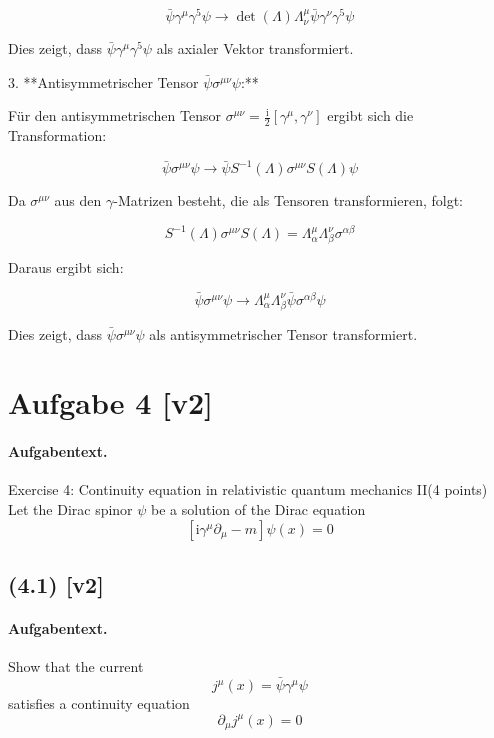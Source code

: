 \documentclass[11pt,a4paper]{article}
\begin{document}
\[
\bar{\psi} \gamma^\mu \gamma^5 \psi \rightarrow \operatorname{det}(\Lambda) \Lambda_\nu^\mu \bar{\psi} \gamma^\nu \gamma^5 \psi
\]

Dies zeigt, dass \(\bar{\psi} \gamma^\mu \gamma^5 \psi\) als axialer Vektor transformiert.

3. **Antisymmetrischer Tensor \(\bar{\psi} \sigma^{\mu \nu} \psi\):**

Für den antisymmetrischen Tensor \(\sigma^{\mu \nu} = \frac{\mathrm{i}}{2} [\gamma^\mu, \gamma^\nu]\) ergibt sich die Transformation:

\[
\bar{\psi} \sigma^{\mu \nu} \psi \rightarrow \bar{\psi} S^{-1}(\Lambda) \sigma^{\mu \nu} S(\Lambda) \psi
\]

Da \(\sigma^{\mu \nu}\) aus den \(\gamma\)-Matrizen besteht, die als Tensoren transformieren, folgt:

\[
S^{-1}(\Lambda) \sigma^{\mu \nu} S(\Lambda) = \Lambda_\alpha^\mu \Lambda_\beta^\nu \sigma^{\alpha \beta}
\]

Daraus ergibt sich:

\[
\bar{\psi} \sigma^{\mu \nu} \psi \rightarrow \Lambda_\alpha^\mu \Lambda_\beta^\nu \bar{\psi} \sigma^{\alpha \beta} \psi
\]

Dies zeigt, dass \(\bar{\psi} \sigma^{\mu \nu} \psi\) als antisymmetrischer Tensor transformiert.


\section*{Aufgabe 4 [v2]}
\paragraph{Aufgabentext.}
Exercise 4: Continuity equation in relativistic quantum mechanics II(4 points) Let the Dirac spinor $\psi$ be a solution of the Dirac equation
$$
\left[\mathrm{i} \gamma^\mu \partial_\mu-m\right] \psi(x)=0
$$

\subsection*{(4.1) [v2]}
\paragraph{Aufgabentext.}
Show that the current
$$
j^\mu(x)=\bar{\psi} \gamma^\mu \psi
$$
satisfies a continuity equation
$$
\partial_\mu j^\mu(x)=0
$$
\end{document}
